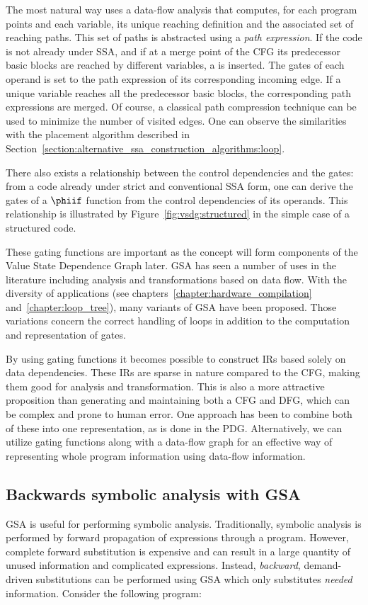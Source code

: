 The most natural way uses a data-flow analysis that computes, for each program points and each variable, its unique reaching definition and the associated set of reaching paths. 
This set of paths is abstracted using a \emph{path expression}. 
If the code is not already under SSA, and if at a merge point of the CFG its predecessor basic blocks are reached by different variables, a \phifun is inserted. 
The gates of each operand is set to the path expression of its corresponding incoming edge. 
If a unique variable reaches all the predecessor basic blocks, the corresponding path expressions are merged. 
Of course, a classical path compression technique can be used to minimize the number of visited edges. 
One can observe the similarities with the \phifun placement algorithm described in Section~\ref{section:alternative_ssa_construction_algorithms:loop}.

There also exists a relationship between the control dependencies and the gates: 
from a code already under strict and conventional SSA form, one can derive the gates of a $\phiif$ function from the control dependencies of its operands. 
This relationship is illustrated by Figure~\ref{fig:vsdg:structured} in the simple case of a structured code.
 
These gating functions are important as the concept will form components of the Value State Dependence Graph later. 
GSA has seen a number of uses in the literature including analysis and transformations based on data flow. 
With the diversity of applications (see chapters~\ref{chapter:hardware_compilation} and~\ref{chapter:loop_tree}), many variants of GSA have been proposed. 
Those variations concern the correct handling of loops in addition to the computation and representation of gates.


By using gating functions it becomes possible to construct IRs based solely on data dependencies. 
These IRs are sparse in nature compared to the CFG, making them good for analysis and transformation. 
This is also a more attractive proposition than generating and maintaining both a CFG and DFG, which can be complex and prone to human error. 
One approach has been to combine both of these into one representation, as is done in the PDG. 
Alternatively, we can utilize gating functions along with a data-flow graph for an effective way of representing whole program information using data-flow information.

\subsection{Backwards symbolic analysis with GSA}
GSA is useful for performing symbolic analysis. 
Traditionally, symbolic analysis is performed by forward propagation of expressions through a program. 
However, complete forward substitution is expensive and can result in a large quantity of unused information and complicated expressions. 
Instead, \textit{backward}, demand-driven substitutions can be performed using GSA which only substitutes \textit{needed} information. 
Consider the following program:


